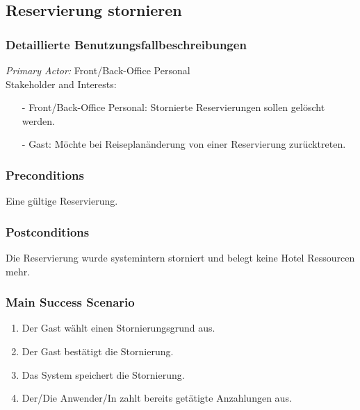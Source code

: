 \documentclass[./detailed_overview_usecases.tex]{subfiles}
\begin{document}
    \subsection{Reservierung stornieren}
    \subsubsection{Detaillierte Benutzungsfallbeschreibungen}
    \textit{Primary Actor:}
    Front/Back-Office Personal
    \\
    Stakeholder and Interests:
    \begin{itemize}
        \item[-] Front/Back-Office Personal: Stornierte Reservierungen sollen gelöscht werden.
        \item[-] Gast: Möchte bei Reiseplanänderung von einer Reservierung zurücktreten.
    \end{itemize}

    \subsubsection*{Preconditions}
    Eine gültige Reservierung.

    \subsubsection*{Postconditions}
    Die Reservierung wurde systemintern storniert und belegt keine Hotel Ressourcen mehr.

    \subsubsection*{Main Success Scenario}
    \begin{enumerate}
        \item Der Gast wählt einen Stornierungsgrund aus.
        \item Der Gast bestätigt die Stornierung.
        \item Das System speichert die Stornierung.
        \item Der/Die Anwender/In zahlt bereits getätigte Anzahlungen aus.
    \end{enumerate}
\end{document}
